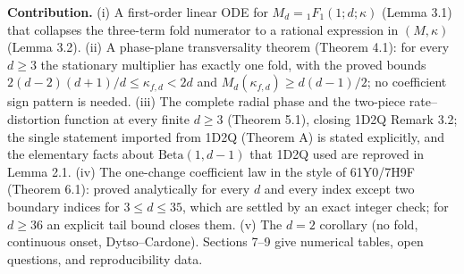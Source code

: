 \documentclass[
  11pt,
  a4paper,
]{article}
\begin{document}
\textbf{Contribution.} (i) A first-order linear ODE for
\(M_d={}_1F_1(1;\allowbreak{}d;\allowbreak{}\kappa)\) (Lemma 3.1) that collapses the three-term
fold numerator to a rational expression in \((M,\allowbreak{}\kappa)\) (Lemma 3.2).
(ii) A phase-plane transversality theorem (Theorem 4.1): for every
\(d\ge3\) the stationary multiplier has exactly one fold, with the
proved bounds \(2(d-2)(d+1)/d\le\kappa_{f,\allowbreak{}d}<2d\) and
\(M_d(\kappa_{f,\allowbreak{}d})\ge d(d-1)/2\); no coefficient sign pattern is
needed. (iii) The complete radial phase and the two-piece
rate--distortion function at every finite \(d\ge3\) (Theorem 5.1),
closing 1D2Q Remark 3.2; the single statement imported from 1D2Q
(Theorem A) is stated explicitly, and the elementary facts about
\(\mathrm{Beta}(1,\allowbreak{}d-1)\) that 1D2Q used are reproved in Lemma 2.1. (iv)
The one-change coefficient law in the style of 61Y0/7H9F (Theorem 6.1):
proved analytically for every \(d\) and every index except two boundary
indices for \(3\le d\le35\), which are settled by an exact integer
check; for \(d\ge36\) an explicit tail bound closes them. (v) The
\(d=2\) corollary (no fold, continuous onset, Dytso--Cardone). Sections
7--9 give numerical tables, open questions, and reproducibility data.
\end{document}

